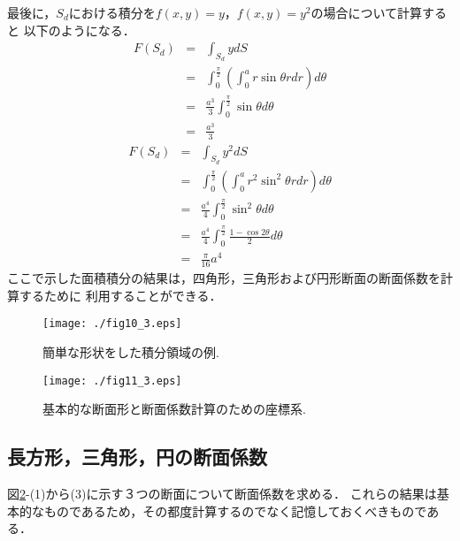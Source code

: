 \documentclass[10pt,a4j]{jbook}
\begin{document}
最後に，$S_d$における積分を$f(x,y)=y$，$f(x,y)=y^2$の場合について計算すると
以下のようになる．
\begin{eqnarray}
	F(S_d) 
	&=& \int_{S_d} y dS \nonumber \\
	&=& \int_0^\frac{\pi}{2} \left( \int_0^a r\sin\theta rdr \right)d\theta \nonumber \\
	&=& \frac{a^3}{3}\int_0^\frac{\pi}{2} \sin\theta  d\theta \nonumber \\
	&=& \frac{a^3}{3}
	\label{eqn:int_Sd_y}
\end{eqnarray}
\begin{eqnarray}
	F(S_d) 
	&=& \int_{S_d} y^2 dS \nonumber \\
	&=& \int_0^\frac{\pi}{2} \left( \int_0^a r^2\sin^2\theta rdr \right)d\theta \nonumber \\
	&=& \frac{a^4}{4}\int_0^\frac{\pi}{2} \sin^2\theta d\theta \nonumber \\
	&=& \frac{a^4}{4} \int_0^\frac{\pi}{2} \frac{1-\cos 2\theta}{2} d\theta 
	\nonumber
	\\
	&=& \frac{\pi}{16}a^4
	\label{eqn:int_Sd_y2}
\end{eqnarray}
ここで示した面積積分の結果は，四角形，三角形および円形断面の断面係数を計算するために
利用することができる．
\begin{figure}[h]
	\begin{center}
	\texttt{[image: ./fig10\_3.eps]} 
	\end{center}
	\caption{
		簡単な形状をした積分領域の例. 
	} 
	\label{fig:fig10_3}
\end{figure}
\begin{figure}[h]
	\begin{center}
	\texttt{[image: ./fig11\_3.eps]} 
	\end{center}
	\caption{
		基本的な断面形と断面係数計算のための座標系.
	} 
	\label{fig:fig11_3}
\end{figure}
\subsection{長方形，三角形，円の断面係数}
図\ref{fig:fig11_3}-(1)から(3)に示す３つの断面について断面係数を求める．
これらの結果は基本的なものであるため，その都度計算するのでなく記憶しておくべきものである．
\end{document}
